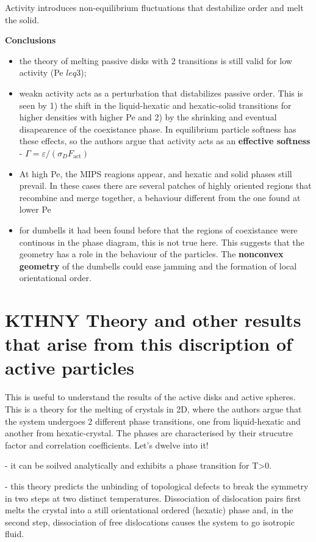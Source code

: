 \documentclass[a4paper]{article}
\begin{document}
Activity introduces non-equilibrium fluctuations that destabilize order and melt the solid.

\textbf{Conclusions}

\begin{itemize}
	\item the theory of melting passive disks with 2 transitions is still valid for low activity (Pe $leq$3);
	\item weakn activity acts as a perturbation that distabilizes passive order. This is seen by 1) the shift in the liquid-hexatic and hexatic-solid transitions for higher densities with higher Pe and 2) by the shrinking and eventual disapearence of the coexistance phase. In equilibrium particle softness has these effects, so the authors argue that activity acts as an \textbf{effective softness} - $\Gamma = \varepsilon/(\sigma_D F_\text{act})$
	\item At high Pe, the MIPS reagions appear, and hexatic and solid phases still prevail. In these cases there are several patches of highly oriented regions that recombine and merge together, a behaviour different from the one found at lower Pe
	\item for dumbells it had been found before that the regions of coexistance were continous in the phase diagram, this is not true here. This suggests that the geometry has a role in the behaviour of the particles.  The \textbf{nonconvex geometry} of the dumbells could ease jamming and the formation of local orientational order.
\end{itemize}

\section{KTHNY Theory and other results that arise from this discription of active particles}

This is useful to understand the results of the active disks and active spheres. This is a theory for the melting of crystals in 2D, where the authors argue that the system undergoes 2 different phase transitions, one from liquid-hexatic and another from hexatic-crystal. The phases are characterised by their strucutre factor and correlation coefficients. Let's dwelve into it!

- it can be soilved analytically and exhibits a phase transition for T>0.

- this theory predicts the unbinding of topological defects to break the symmetry in two steps at two distinct temperatures. Dissociation of dislocation pairs first
melts the crystal into a still orientational ordered (hexatic) phase and, in the second step,
dissociation of free dislocations causes the system to go isotropic fluid.
\end{document}
